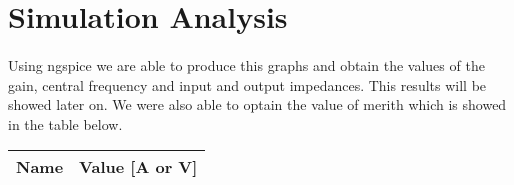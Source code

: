 \section{Simulation Analysis}
\label{sec:simulation}


\paragraph{} Using ngspice we are able to produce this graphs and obtain the values of the gain, central
frequency and input and output impedances. This results will be showed later on. We were also able to optain
the value of merith which is showed in the table below.


\begin{table}[h]
    \centering
    \begin{tabular}{|l|l|}
        \hline
        {\bf Name} & {\bf Value [A or V]} \\ \hline
        
    \end{tabular}
\end{table}


